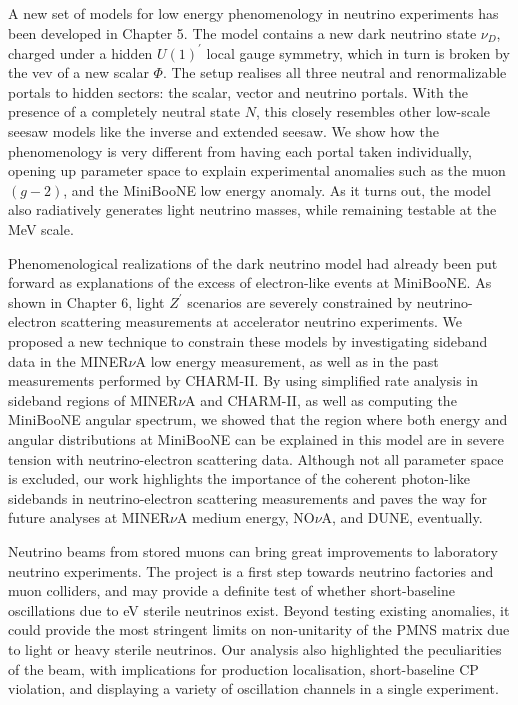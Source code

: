A new set of models for low energy phenomenology in neutrino experiments has been developed in Chapter 5. The model contains a new dark neutrino state $\nu_D$, charged under a hidden $U(1)^\prime$ local gauge symmetry, which in turn is broken by the vev of a new scalar $\Phi$. The setup realises all three neutral and renormalizable portals to hidden sectors: the scalar, vector and neutrino portals. With the presence of a completely neutral state $N$, this closely resembles other low-scale seesaw models like the inverse and extended seesaw. We show how the phenomenology is very different from having each portal taken individually, opening up parameter space to explain experimental anomalies such as the muon $(g-2)$, and the MiniBooNE low energy anomaly. As it turns out, the model also radiatively generates light neutrino masses, while remaining testable at the MeV scale.  

Phenomenological realizations of the dark neutrino model had already been put forward as explanations of the excess of electron-like events at MiniBooNE. As shown in Chapter 6, light $Z^\prime$ scenarios are severely constrained by neutrino-electron scattering measurements at accelerator neutrino experiments. We proposed a new technique to constrain these models by investigating sideband data in the MINER$\nu$A low energy measurement, as well as in the past measurements performed by CHARM-II. By using simplified rate analysis in sideband regions of MINER$\nu$A and CHARM-II, as well as computing the MiniBooNE angular spectrum, we showed that the region where both energy and angular distributions at MiniBooNE can be explained in this model are in severe tension with neutrino-electron scattering data. Although not all parameter space is excluded, our work highlights the importance of the coherent photon-like sidebands in neutrino-electron scattering measurements and paves the way for future analyses at MINER$\nu$A medium energy, NO$\nu$A, and DUNE, eventually.

Neutrino beams from stored muons can bring great improvements to laboratory neutrino experiments. The \nus project is a first step towards neutrino factories and muon colliders, and may provide a definite test of whether short-baseline oscillations due to eV sterile neutrinos exist. Beyond testing existing anomalies, it could provide the most stringent limits on non-unitarity of the PMNS matrix due to light or heavy sterile neutrinos. Our analysis also highlighted the peculiarities of the beam, with implications for production localisation, short-baseline CP violation, and displaying a variety of oscillation channels in a single experiment.

